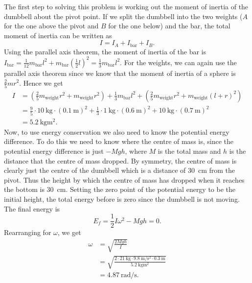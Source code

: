 \documentclass[../classical_mechanics.tex]{subfiles}
\begin{document}
\begin{example}
                The first step to solving this problem is working out the moment of inertia of the dumbbell about the pivot point.
                If we split the dumbbell into the two weights ($A$ for the one above the pivot and $B$ for the one below) and the bar, the total moment of inertia can be written as
                \begin{equation}
                    I=I_A+I_\text{bar}+I_B.
                \end{equation}
                Using the parallel axis theorem, the moment of inertia of the bar is $I_\text{bar}=\frac{1}{12}m_\text{bar}l^2+m_\text{bar}\left(\frac{1}{2}l\right)^2=\frac{1}{3}m_\text{bar}l^2$.
                For the weights, we can again use the parallel axis theorem since we know that the moment of inertia of a sphere is $\frac{2}{5}mr^2$.
                Hence we get
                \begin{align}
                    I&=\left(\frac{2}{5}m_\text{weight}r^2+m_\text{weight}r^2\right)+\frac{1}{3}m_\text{bar}l^2+\left(\frac{2}{5}m_\text{weight}r^2+m_\text{weight}(l+r)^2\right)\\
                    &=\frac{9}{5}\cdot\qty{10}{\kilogram}\cdot(\qty{0.1}{\meter})^2+\frac{1}{3}\cdot\qty{1}{\kilogram}\cdot(\qty{0.6}{\meter})^2+\qty{10}{\kilogram}\cdot(\qty{0.7}{\meter})^2\\
                    &=\qty{5.2}{\kilogram\meter\squared}.
                \end{align}
                Now, to use energy conservation we also need to know the potential energy difference.
                To do this we need to know where the centre of mass is, since the potential energy difference is just $-Mgh$, where $M$ is the total mass and $h$ is the distance that the centre of mass dropped.
                By symmetry, the centre of mass is clearly just the centre of the dumbbell which is a distance of \qty{30}{\centi\meter} from the pivot.
                Thus the height by which the centre of mass has dropped when it reaches the bottom is \qty{30}{\centi\meter}.
                Setting the zero point of the potential energy to be the initial height, the total energy before is zero since the dumbbell is not moving.
                The final energy is
                \begin{equation}
                    E_f=\frac{1}{2}I\omega^2-Mgh=0.
                \end{equation}
                Rearranging for $\omega$, we get
                \begin{align}
                    \omega&=\sqrt{\frac{2Mgh}{I}}\\
                    &=\sqrt{\frac{2\cdot\qty{21}{\kilogram}\cdot\qty{9.8}{\meter\per\second\squared}\cdot\qty{0.3}{\meter}}{\qty{5.2}{\kilogram\meter\squared}}}\\
                    &=\qty{4.87}{\radian\per\second}.
                \end{align}
            \end{example}
\end{document}
